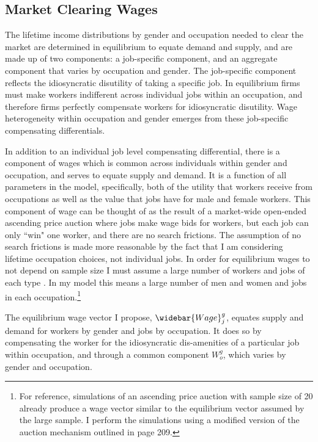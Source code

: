 \documentclass[12pt]{article}
\begin{document}
\subsection{Market Clearing Wages}

The lifetime income distributions by gender and occupation needed to clear the market are determined in equilibrium to equate demand and supply, and are made up of two components: a job-specific component, and an aggregate component that varies by occupation and gender. The job-specific component reflects the idiosyncratic disutility of taking a specific job. In equilibrium firms must make workers indifferent across individual jobs within an occupation, and therefore firms perfectly compensate workers for idiosyncratic disutility. Wage heterogeneity within occupation and gender emerges from these job-specific compensating differentials. 

In addition to an individual job level compensating differential, there is a component of wages which is common across individuals within gender and occupation, and serves to equate supply and demand. It is a function of all parameters in the model, specifically, both of the utility that workers receive from occupations as well as the value that jobs have for male and female workers. This component of wage can be thought of as the result of a market-wide open-ended ascending price auction where jobs make wage bids for workers, but each job can only ``win" one worker, and there are no search frictions. The assumption of no search frictions is made more reasonable by the fact that I am considering lifetime occupation choices, not individual jobs. In order for equilibrium wages to not depend on sample size I must assume a large number of workers and jobs of each type \cite{Galichon2013b}. In my model this means a large number of men and women and jobs in each occupation.\footnote{For reference, simulations of an ascending price auction with sample size of 20 already produce a wage vector similar to the equilibrium vector assumed by the large sample. I perform the simulations using a modified version of the auction mechanism outlined in  page 209.}

The equilibrium wage vector I propose,  $\widebar{Wage}^g_j$, equates supply and demand for workers by gender and jobs by occupation. It does so by compensating the worker for the idiosyncratic dis-amenities of a particular job within occupation, and through a common component $W^g_o$, which varies by gender and occupation.
\end{document}
